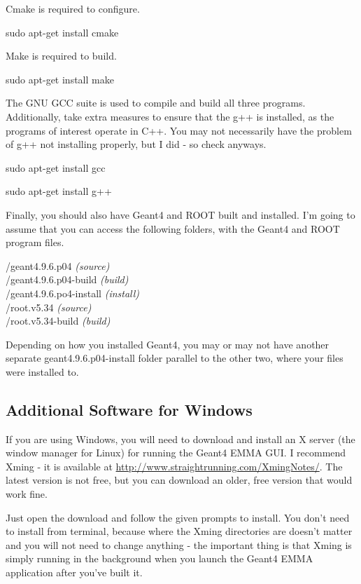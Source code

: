 \documentclass{article}
\newcommand{\filefont}[1]{{\fontfamily{pnc}\selectfont #1}\xspace}
\begin{document}
Cmake is required to configure. 

\filefont{sudo apt-get install cmake}

Make is required to build.

\filefont{sudo apt-get install make}

The GNU GCC suite is used to compile and build all three programs. Additionally, take extra measures to ensure that the g++ is installed, as the programs of interest operate in C++. You may not necessarily have the problem of g++ not installing properly, but I did - so check anyways. 

\filefont{sudo apt-get install gcc}

\filefont{sudo apt-get install g++}

Finally, you should also have Geant4 and ROOT built and installed. I'm going to assume that you can access the following folders, with the Geant4 and ROOT program files.  

\filefont{[path to]/geant4.9.6.p04} \textit{(source)} \\
\filefont{[path to]/geant4.9.6.p04-build} \textit{(build)} \\
\filefont{[path to]/geant4.9.6.po4-install} \textit{(install)}\\
\filefont{[path to]/root.v5.34} \textit{(source)} \\
\filefont{[path to]/root.v5.34-build} \textit{(build)} 

Depending on how you installed Geant4, you may or may not have another separate \filefont{geant4.9.6.p04-install} folder parallel to the other two, where your files were installed to.  

\subsection{Additional Software for Windows}

If you are using Windows, you will need to download and install an X server (the window manager for Linux) for running the Geant4 EMMA GUI. I recommend Xming - it is available at \hyperref[http://www.straightrunning.com/XmingNotes/]{http://www.straightrunning.com/XmingNotes/}. The latest version is not free, but you can download an older, free version that would work fine. 

Just open the download and follow the given prompts to install. You don't need to install from terminal, because where the Xming directories are doesn't matter and you will not need to change anything - the important thing is that Xming is simply running in the background when you launch the Geant4 EMMA application after you've built it. 
\end{document}

